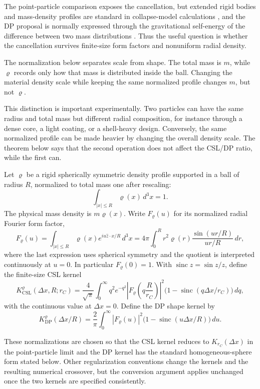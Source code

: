 \documentclass[
  aps,
  prd,
  preprint,
  notitlepage,
  superscriptaddress,
  nofootinbib,
  longbibliography
]{revtex4-2}
\newcommand{\dx}{\Delta x}
\newcommand{\sinc}{\operatorname{sinc}}
\newcommand{\Krc}{K_{r_C}}
\begin{document}
The point-particle comparison exposes the cancellation, but extended rigid bodies and mass-density profiles are standard in collapse-model calculations \cite{FerialdiBassi2020}, and the DP proposal is normally expressed through the gravitational self-energy of the difference between two mass distributions \cite{Diosi1987,Diosi1989,Penrose1996,Diosi2022}. Thus the useful question is whether the cancellation survives finite-size form factors and nonuniform radial density.

The normalization below separates scale from shape. The total mass is $m$, while $\varrho$ records only how that mass is distributed inside the ball. Changing the material density scale while keeping the same normalized profile changes $m$, but not $\varrho$.

This distinction is important experimentally. Two particles can have the same radius and total mass but different radial composition, for instance through a dense core, a light coating, or a shell-heavy design. Conversely, the same normalized profile can be made heavier by changing the overall density scale. The theorem below says that the second operation does not affect the CSL/DP ratio, while the first can.

Let $\varrho$ be a rigid spherically symmetric density profile supported in a ball of radius $R$, normalized to total mass one after rescaling:
\[
\int_{|x|\le R}\varrho(x)\,d^3x=1.
\]
The physical mass density is $m\varrho(x)$. Write $F_\varrho(u)$ for its normalized radial Fourier form factor,
\[
F_\varrho(u)
=\int_{|x|\le R}\varrho(x)e^{iu\hat z\cdot x/R}\,d^3x
=4\pi\int_0^R r^2\varrho(r)\frac{\sin(ur/R)}{ur/R}\,dr,
\]
where the last expression uses spherical symmetry and the quotient is interpreted continuously at $u=0$. In particular $F_\varrho(0)=1$. With $\sinc z=\sin z/z$, define the finite-size CSL kernel
\[
K_{\mathrm{CSL}}^\varrho(\dx,R;r_C)
=\frac{4}{\sqrt\pi}\int_0^\infty q^2e^{-q^2}
\left|F_\varrho\!\left(q\frac{R}{r_C}\right)\right|^2
\bigl(1-\sinc(q\dx/r_C)\bigr)\,dq,
\]
with the continuous value at $\dx=0$. Define the DP shape kernel by
\[
K_{\mathrm{DP}}^\varrho(\dx/R)
=\frac{2}{\pi}\int_0^\infty |F_\varrho(u)|^2
\bigl(1-\sinc(u\dx/R)\bigr)\,du.
\]

These normalizations are chosen so that the CSL kernel reduces to $\Krc(\dx)$ in the point-particle limit and the DP kernel has the standard homogeneous-sphere form stated below. Other regularization conventions change the kernels and the resulting numerical crossover, but the conversion argument applies unchanged once the two kernels are specified consistently.
\end{document}
